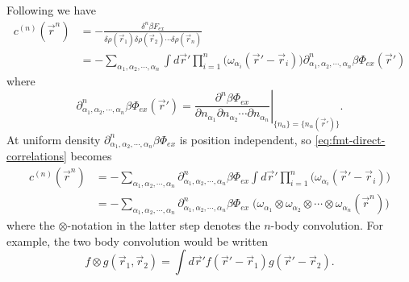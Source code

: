 \documentclass[11pt]{report}
\begin{document}
Following \cite{Rosenfeld1990} we have
\begin{equation}\label{eq:fmt-direct-correlations}
  \begin{aligned}
    c^{(n)}(\vec{r}^n) &=
    - \frac{\delta^n \beta F_{ex}}{\delta \rho(\vec{r}_1)\delta \rho(\vec{r}_2) \cdots \delta \rho(\vec{r}_n)} \\
    &=
    - \sum_{\alpha_1, \alpha_2, \cdots, \alpha_n}
    \int d\vec{r}'
    \prod_{i=1}^n \Big( \omega_{\alpha_i}(\vec{r}' - \vec{r}_i) \Big)
    \partial^n_{\alpha_1, \alpha_2, \cdots, \alpha_n} \beta\Phi_{ex}(\vec{r}')
  \end{aligned}
\end{equation}
where
\begin{equation*}
  \partial^n_{\alpha_1, \alpha_2, \cdots, \alpha_n} \beta\Phi_{ex}(\vec{r}') =
  \left.
  \frac{\partial^n \beta\Phi_{ex}}{\partial n_{\alpha_1} \partial n_{\alpha_2} \cdots \partial n_{\alpha_n}}
  \right|_{\{n_\alpha\} = \{n_\alpha(\vec{r}')\}}.
\end{equation*}
At uniform density $\partial^n_{\alpha_1, \alpha_2, \cdots, \alpha_n} \beta\Phi_{ex}$ is position independent, so \eqref{eq:fmt-direct-correlations} becomes
\begin{equation}\label{eq:fmt-direct-correlations-uniform-density}
  \begin{aligned}
    c^{(n)}(\vec{r}^n) &=
    - \sum_{\alpha_1, \alpha_2, \cdots, \alpha_n}
    \partial^n_{\alpha_1, \alpha_2, \cdots, \alpha_n} \beta\Phi_{ex}
    \int d\vec{r}'
    \prod_{i=1}^n \Big( \omega_{\alpha_i}(\vec{r}' - \vec{r}_i) \Big) \\
    &=
    - \sum_{\alpha_1, \alpha_2, \cdots, \alpha_n}
    \partial^n_{\alpha_1, \alpha_2, \cdots, \alpha_n} \beta\Phi_{ex} \;
    \Big(
    \omega_{\alpha_1} \otimes \omega_{\alpha_2} \otimes \cdots \otimes \omega_{\alpha_n}
    (\vec{r}^n)
    \Big)
  \end{aligned}
\end{equation}
where the $\otimes$-notation in the latter step denotes the $n$-body convolution.
For example, the two body convolution would be written%
\begin{equation*}
  f \otimes g(\vec{r}_1, \vec{r}_2) =
  \int d\vec{r}' f(\vec{r}' - \vec{r}_1) g(\vec{r}' - \vec{r}_2).
\end{equation*}
\end{document}
